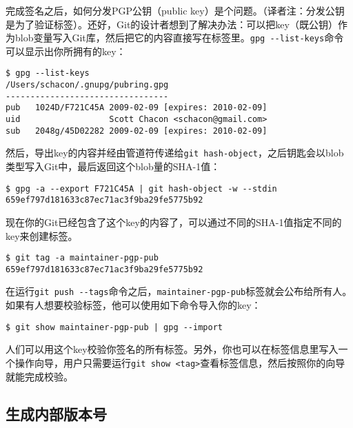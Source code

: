 \documentclass[a4paper]{book}
\begin{document}
完成签名之后，如何分发PGP公钥（public key）是个问题。（译者注：分发公钥是为了验证标签）。还好，Git的设计者想到了解决办法：可以把key（既公钥）作为blob变量写入Git库，然后把它的内容直接写在标签里。\texttt{gpg -{}-list-keys}命令可以显示出你所拥有的key：

\begin{shaded}\begin{verbatim}
$ gpg --list-keys
/Users/schacon/.gnupg/pubring.gpg
---------------------------------
pub   1024D/F721C45A 2009-02-09 [expires: 2010-02-09]
uid                  Scott Chacon <schacon@gmail.com>
sub   2048g/45D02282 2009-02-09 [expires: 2010-02-09]
\end{verbatim}\end{shaded}

然后，导出key的内容并经由管道符传递给\texttt{git hash-object}，之后钥匙会以blob类型写入Git中，最后返回这个blob量的SHA-1值：

\begin{shaded}\begin{verbatim}
$ gpg -a --export F721C45A | git hash-object -w --stdin
659ef797d181633c87ec71ac3f9ba29fe5775b92
\end{verbatim}\end{shaded}

现在你的Git已经包含了这个key的内容了，可以通过不同的SHA-1值指定不同的key来创建标签。

\begin{shaded}\begin{verbatim}
$ git tag -a maintainer-pgp-pub 659ef797d181633c87ec71ac3f9ba29fe5775b92
\end{verbatim}\end{shaded}

在运行\texttt{git push -{}-tags}命令之后，\texttt{maintainer-pgp-pub}标签就会公布给所有人。如果有人想要校验标签，他可以使用如下命令导入你的key：

\begin{shaded}\begin{verbatim}
$ git show maintainer-pgp-pub | gpg --import
\end{verbatim}\end{shaded}

人们可以用这个key校验你签名的所有标签。另外，你也可以在标签信息里写入一个操作向导，用户只需要运行\texttt{git show \textless{}tag\textgreater{}}查看标签信息，然后按照你的向导就能完成校验。

\subsection{生成内部版本号}
\end{document}
